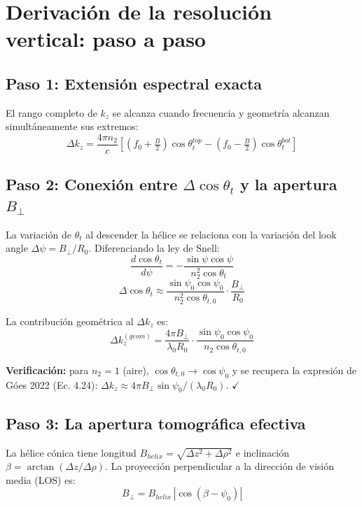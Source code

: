 \documentclass[12pt,a4paper,oneside]{book}
\begin{document}
\section{Derivación de la resolución vertical: paso a paso}

\subsection{Paso 1: Extensión espectral exacta}

El rango completo de $k_z$ se alcanza cuando frecuencia y geometría alcanzan simultáneamente sus extremos:
\[
\Delta k_z = \frac{4\pi n_2}{c}\!\left[(f_0+\tfrac{B}{2})\cos\theta_t^{top} - (f_0-\tfrac{B}{2})\cos\theta_t^{bot}\right]
\]

\subsection{Paso 2: Conexión entre $\Delta\cos\theta_t$ y la apertura $B_\perp$}

La variación de $\theta_t$ al descender la hélice se relaciona con la variación del look angle $\Delta\psi = B_\perp/R_0$. Diferenciando la ley de Snell:
\[
\frac{d\cos\theta_t}{d\psi} = -\frac{\sin\psi\cos\psi}{n_2^2\cos\theta_t}
\]
\[
\Delta\cos\theta_t \approx \frac{\sin\psi_0\cos\psi_0}{n_2^2\cos\theta_{t,0}}\cdot\frac{B_\perp}{R_0}
\]

La contribución geométrica al $\Delta k_z$ es:
\[
\Delta k_z^{(geom)} = \frac{4\pi B_\perp}{\lambda_0 R_0}\cdot\frac{\sin\psi_0\cos\psi_0}{n_2\cos\theta_{t,0}}
\]

\textbf{Verificación:} para $n_2=1$ (aire), $\cos\theta_{t,0}\to\cos\psi_0$ y se recupera la expresión de Góes 2022 (Ec. 4.24): $\Delta k_z \approx 4\pi B_\perp\sin\psi_0/(\lambda_0 R_0)$. $\checkmark$

\subsection{Paso 3: La apertura tomográfica efectiva}

La hélice cónica tiene longitud $B_{helix} = \sqrt{\Delta z^2 + \Delta\rho^2}$ e inclinación $\beta = \arctan(\Delta z/\Delta\rho)$. La proyección perpendicular a la dirección de visión media (LOS) es:
\[
\boxed{B_\perp = B_{helix}\,|\cos(\beta - \psi_0)|}
\]

\begin{center}
\end{center}
\end{document}
